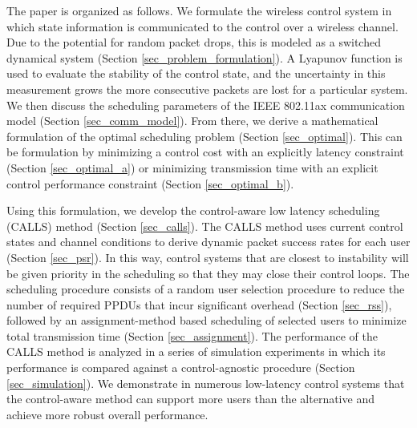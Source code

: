 The paper is organized as follows. We formulate the wireless control system in which state information is communicated to the control over a wireless channel. Due to the potential for random packet drops, this is modeled as a switched dynamical system (Section \ref{sec_problem_formulation}). A Lyapunov function is used to evaluate the stability of the control state, and the uncertainty in this measurement grows the more consecutive packets are lost for a particular system.  We then discuss the scheduling parameters of the IEEE 802.11ax communication model (Section \ref{sec_comm_model}).
From there, we derive a mathematical formulation of the optimal scheduling problem (Section \ref{sec_optimal}). This can be formulation by minimizing a control cost with an explicitly latency constraint (Section \ref{sec_optimal_a}) or minimizing transmission time with an explicit control performance constraint (Section \ref{sec_optimal_b}).

Using this formulation, we develop the control-aware low latency scheduling (CALLS) method (Section \ref{sec_calls}). The CALLS method uses current control states and channel conditions to derive dynamic packet success rates for each user (Section \ref{sec_psr}). In this way, control systems that are closest to instability will be given priority in the scheduling so that they may close their control loops. The scheduling procedure consists of a random user selection procedure to reduce the number of required PPDUs that incur significant overhead  (Section \ref{sec_rss}), followed by an assignment-method based scheduling of selected users to minimize total transmission time (Section \ref{sec_assignment}). The performance of the CALLS method is analyzed in a series of simulation experiments in which its performance is compared against a control-agnostic procedure (Section \ref{sec_simulation}). We demonstrate in numerous low-latency control systems that the control-aware method can support more users than the alternative and achieve more robust overall performance. 

